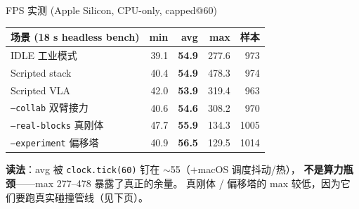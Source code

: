 \documentclass[aspectratio=169, 11pt]{beamer}
\begin{document}
\begin{frame}{FPS 实测 (Apple Silicon, CPU-only, capped@60)}
\centering\small
\begin{tabular}{lrrrr}
\toprule
场景 (18 s headless bench) & min & avg & max & 样本 \\
\midrule
IDLE 工业模式        & 39.1 & \textbf{54.9} & 277.6 &  973 \\
Scripted stack       & 40.4 & \textbf{54.9} & 478.3 &  974 \\
Scripted VLA         & 42.0 & \textbf{53.9} & 319.4 &  963 \\
\texttt{--collab} 双臂接力 & 40.6 & \textbf{54.6} & 308.2 &  970 \\
\texttt{--real-blocks} 真刚体 & 47.7 & \textbf{55.9} & 134.3 & 1005 \\
\texttt{--experiment} 偏移塔 & 40.9 & \textbf{56.5} & 129.5 & 1014 \\
\bottomrule
\end{tabular}

\vspace{8pt}
\footnotesize
\textbf{读法}：avg 被 \texttt{clock.tick(60)} 钉在 $\sim$55（+macOS 调度抖动/热），
\textbf{不是算力瓶颈}——\textcolor{urcyan}{max 277--478} 暴露了真正的余量。
真刚体 / 偏移塔的 max 较低，因为它们要跑真实碰撞管线（见下页）。
\end{frame}
\end{document}
